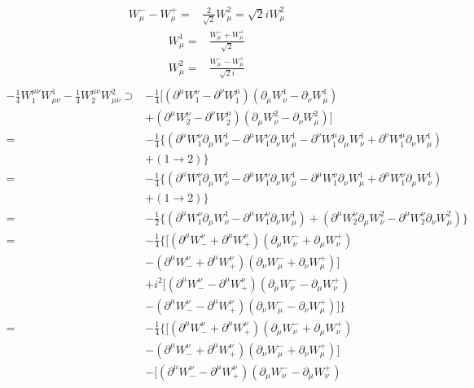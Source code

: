 \begin{itemize}
\begin{align}
W_\mu^--W_\mu^+=&\frac{2}{\sqrt{2}}W_\mu^2=\sqrt{2}i W_\mu^2
\end{align}
\begin{align}
  W_\mu^1=&\frac{W_\mu^-+W_\mu^+}{\sqrt{2}}\nonumber\\
  W_\mu^2=&\frac{W_\mu^--W_\mu^+}{\sqrt{2}i}\nonumber\\
\end{align}
\begin{align}
  -\tfrac{1}{4}W^{\mu\nu}_1W_{\mu\nu}^1  -\tfrac{1}{4}W^{\mu\nu}_2W_{\mu\nu}^2\supset&
-\tfrac{1}{4}[(\partial^\mu W^\nu_1-\partial^\nu W^\mu_1)(\partial_\mu W_\nu^1-\partial_\nu W_\mu^1)\nonumber\\
&+(\partial^\mu W^\nu_2-\partial^\nu W^\mu_2)(\partial_\mu W_\nu^2-\partial_\nu W_\mu^2)
]\nonumber\\
 = &-\tfrac{1}{4}\{(\partial^\mu W^\nu_1\partial_\mu W_\nu^1-\partial^\mu W^\nu_1\partial_\nu W_\mu^1-\partial^\nu W^\mu_1\partial_\mu W_\nu^1+\partial^\nu W^\mu_1\partial_\nu W_\mu^1)
\nonumber\\
&+(1\to2)\}\nonumber\\
 = &-\tfrac{1}{4}\{(\partial^\mu W^\nu_1\partial_\mu W_\nu^1-\partial^\mu W^\nu_1\partial_\nu W_\mu^1-\partial^\mu W^\nu_1\partial_\nu W_\mu^1+\partial^\mu W^\nu_1\partial_\mu W_\nu^1)
\nonumber\\
&+(1\to2)\}\nonumber\\
 = &-\tfrac{1}{2}\{(\partial^\mu W^\nu_1\partial_\mu W_\nu^1-\partial^\mu W^\nu_1\partial_\nu W_\mu^1)
+(\partial^\mu W^\nu_2\partial_\mu W_\nu^2-\partial^\mu W^\nu_2\partial_\nu W_\mu^2)
\}\nonumber\\
 = &-\tfrac{1}{4}\{[ (\partial^\mu W^\nu_-+\partial^\mu W^\nu_+)(\partial_\mu W_\nu^-+\partial_\mu W_\nu^+)\nonumber\\
&-(\partial^\mu W^\nu_-+\partial^\mu W^\nu_+)(\partial_\nu W_\mu^-+\partial_\nu W_\mu^+)]\nonumber\\
&+i^2[(\partial^\mu W^\nu_--\partial^\mu W^\nu_+)(\partial_\mu W_\nu^--\partial_\mu W_\nu^+)\nonumber\\
&-(\partial^\mu W^\nu_--\partial^\mu W^\nu_+)(\partial_\nu W_\mu^--\partial_\nu W_\mu^+)]\}\nonumber\\
 = &-\tfrac{1}{4}\{[ (\partial^\mu W^\nu_-+\partial^\mu W^\nu_+)(\partial_\mu W_\nu^-+\partial_\mu W_\nu^+)\nonumber\\
&-(\partial^\mu W^\nu_-+\partial^\mu W^\nu_+)(\partial_\nu W_\mu^-+\partial_\nu W_\mu^+)]\nonumber\\
&-[(\partial^\mu W^\nu_--\partial^\mu W^\nu_+)(\partial_\mu W_\nu^--\partial_\mu W_\nu^+)\nonumber\\

\end{align}
\end{itemize}

